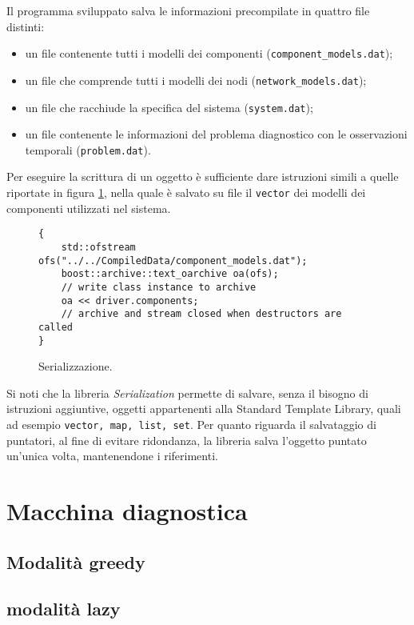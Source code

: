 Il programma sviluppato salva le informazioni precompilate in quattro file distinti:
\begin{itemize}
\item un file contenente tutti i modelli dei componenti (\verb|component_models.dat|);
\item un file che comprende tutti i modelli dei nodi (\verb|network_models.dat|);
\item un file che racchiude la specifica del sistema (\verb|system.dat|);
\item un file contenente le informazioni del problema diagnostico con le osservazioni temporali (\verb|problem.dat|).
\end{itemize}
Per eseguire la scrittura di un oggetto è sufficiente dare istruzioni simili a quelle riportate in figura \ref{code:serialize_main}, nella quale è salvato su file il \verb|vector| dei modelli dei componenti utilizzati nel sistema.

\begin{figure}[htbp]
\begin{verbatim}
{
    std::ofstream ofs("../../CompiledData/component_models.dat");
    boost::archive::text_oarchive oa(ofs);
    // write class instance to archive
    oa << driver.components;
    // archive and stream closed when destructors are called
}
\end{verbatim}
\caption{Serializzazione.}
\label{code:serialize_main}
\end{figure}

Si noti che la libreria \emph{Serialization} permette di salvare, senza il bisogno di istruzioni aggiuntive, oggetti appartenenti alla Standard Template Library, quali ad esempio \verb|vector, map, list, set|. Per quanto riguarda il salvataggio di puntatori, al fine di evitare ridondanza, la libreria salva l'oggetto puntato un'unica volta, mantenendone i riferimenti.


\section{Macchina diagnostica}

\subsection{Modalità greedy}

\subsection{modalità lazy}
